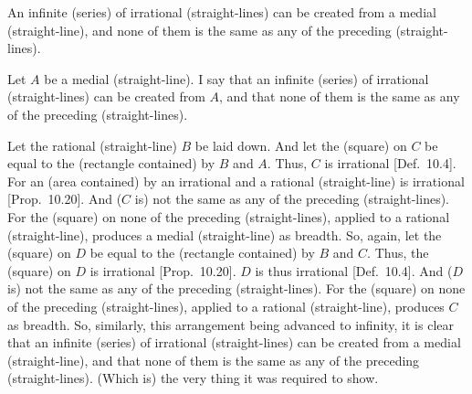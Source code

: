 An infinite (series) of irrational (straight-lines) can be created from a medial
(straight-line), and none of them is the same as any of the preceding
(straight-lines).

\centerline{}

Let $A$ be a medial (straight-line). I say that an infinite (series) of irrational (straight-lines) can be created from $A$, and that none of them is the same as any of the preceding
(straight-lines).

Let the rational (straight-line) $B$ be laid down. And let the (square) on $C$
be equal to the (rectangle contained) by $B$ and $A$. Thus, $C$ is
irrational [Def.~10.4]. For an (area contained) by
an irrational and a rational (straight-line) is irrational [Prop.~10.20]. And ($C$ is) not the same as
any of the preceding (straight-lines). For the (square) on none of
the preceding (straight-lines), applied to a rational (straight-line),
produces a medial (straight-line) as breadth. So, again, let the (square)
on $D$ be equal to the (rectangle contained) by $B$ and $C$. Thus,
the (square) on $D$ is irrational [Prop.~10.20]. 
$D$ is thus irrational [Def.~10.4]. And ($D$ is)
not the same as any of the preceding (straight-lines). For the (square) on
none of the preceding (straight-lines), applied to a rational (straight-line),
produces $C$ as breadth. So, similarly, this arrangement being
advanced to infinity, it is clear that an infinite (series) of irrational (straight-lines) can be created from a medial
(straight-line), and that none of them is the same as any of the preceding
(straight-lines). (Which is) the very thing it was required to show.
